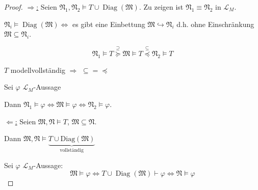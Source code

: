 \documentclass[12pt,parskip=full]{scrartcl}
\newcommand{\heading}{\underline}
\theoremstyle{definition}
\begin{document}
	\begin{proof}
		\heading{$\Rightarrow$:} Seien $\mathfrak{N}_1, \mathfrak{N}_2 \models T \cup \operatorname{Diag}(\mathfrak{M})$. Zu zeigen ist $\mathfrak{N}_1 \equiv \mathfrak{N}_2$ in $\mathcal{L}_M$.
		
		$\mathfrak{N}_i \models \operatorname{Diag}(\mathfrak{M}) \Leftrightarrow$ es gibt eine Einbettung $\mathfrak{M} \hookrightarrow \mathfrak{N}_i$ d.h. ohne Einschränkung $\mathfrak{M} \subseteq \mathfrak{N}_i$.
		
		\begin{equation*}
			\mathfrak{N}_1 \models T \overset{\supseteq}{\succcurlyeq} \mathfrak{M} \models T \overset{\subseteq}{\preccurlyeq} \mathfrak{N}_2 \models T
		\end{equation*}
		
		$T$ modellvollständig $\Rightarrow$ $\subseteq = \preccurlyeq$
		
		Sei $\varphi$ $\mathcal{L}_M$-Aussage
		
		Dann $\mathfrak{N}_1 \models \varphi \Leftrightarrow \mathfrak{M} \models \varphi \Leftrightarrow \mathfrak{N}_2 \models \varphi$.
		
		\heading{$\Leftarrow$:} Seien $\mathfrak{M}, \mathfrak{N} \models T$, $\mathfrak{M} \subseteq \mathfrak{N}$.
		
		Dann $\mathfrak{M}, \mathfrak{N} \models \underbrace{T \cup \operatorname{Diag(\mathfrak{M})}}_\text{vollständig}$
		
		Sei $\varphi$ $\mathcal{L}_M$-Aussage:
		\begin{equation*}
			\mathfrak{M} \models \varphi \Leftrightarrow T \cup \operatorname{Diag}(\mathfrak{M}) \vdash \varphi \Leftrightarrow \mathfrak{N} \models \varphi
		\end{equation*}
	\end{proof}
\end{document}
